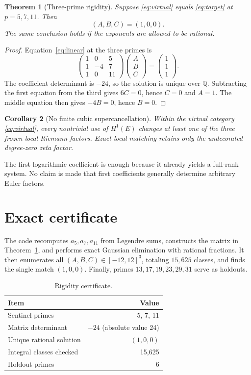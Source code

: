 \documentclass[11pt]{article}
\newtheorem{theorem}{Theorem}[section]
\newtheorem{corollary}[theorem]{Corollary}
\theoremstyle{remark}\newtheorem{remark}[theorem]{Remark}
\begin{document}
\begin{theorem}[Three-prime rigidity]\label{thm:rigidity}
Suppose \eqref{eq:virtual} equals \eqref{eq:target} at
\(p=5,7,11\).  Then
\[
 (A,B,C)=(1,0,0).
\]
The same conclusion holds if the exponents are allowed to be rational.
\end{theorem}
\begin{proof}
Equation~\eqref{eq:linear} at the three primes is
\[
 \begin{pmatrix}
 1&0&5\\
 1&-4&7\\
 1&0&11
 \end{pmatrix}
 \begin{pmatrix}A\\B\\C\end{pmatrix}
 =\begin{pmatrix}1\\1\\1\end{pmatrix}.
\]
The coefficient determinant is \(-24\), so the solution is unique over
\(\mathbb Q\).  Subtracting the first equation from the third gives
\(6C=0\), hence \(C=0\) and \(A=1\).  The middle equation then gives
\(-4B=0\), hence \(B=0\).
\end{proof}

\begin{corollary}[No finite cubic supercancellation]
Within the virtual category \eqref{eq:virtual}, every nontrivial use of
\(H^1(E)\) changes at least one of the three frozen local Riemann factors.
Exact local matching retains only the undecorated degree-zero zeta factor.
\end{corollary}

The first logarithmic coefficient is enough because it already yields a
full-rank system.  No claim is made that first coefficients generally
determine arbitrary Euler factors.

\section{Exact certificate}
The code recomputes \(a_5,a_7,a_{11}\) from Legendre sums, constructs the
matrix in Theorem~\ref{thm:rigidity}, and performs exact Gaussian elimination
with rational fractions.  It then enumerates all
\((A,B,C)\in[-12,12]^3\), totaling \(15{,}625\) classes, and finds the single
match \((1,0,0)\).  Finally, primes \(13,17,19,23,29,31\) serve as holdouts.

\begin{table}[h]
\centering
\caption{Rigidity certificate.}
\begin{tabular}{lr}
\toprule
Item&Value\\\midrule
Sentinel primes&5, 7, 11\\
Matrix determinant&\(-24\) (absolute value 24)\\
Unique rational solution&\((1,0,0)\)\\
Integral classes checked&15,625\\
Holdout primes&6\\
\bottomrule
\end{tabular}
\end{table}
\end{document}
